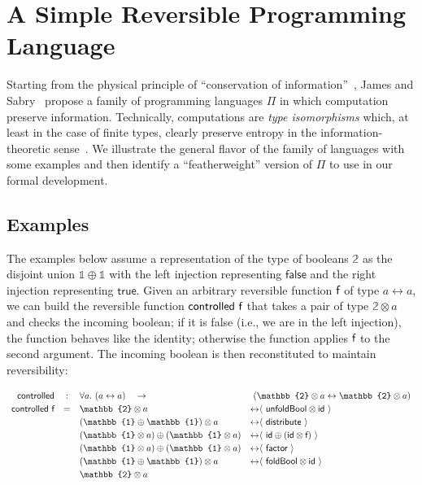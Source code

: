 \documentclass{entcs}
\newcommand{\byiso}[1]{{\leftrightarrow}{\langle} ~#1~ \rangle}
\newcommand{\ot}{\mathbb{1}}
\newcommand{\bt}{\mathbb{2}}
\begin{document}
\section{A Simple Reversible Programming Language}

Starting from the physical principle of ``conservation of
information''~\cite{Hey:1999:FCE:304763,fredkin1982conservative}, James and
Sabry~\cite{James:2012:IE:2103656.2103667} propose a family of programming
languages $\Pi$ in which computation preserve information. Technically,
computations are \emph{type isomorphisms} which, at least in the case of finite
types, clearly preserve entropy in the information-theoretic
sense~\cite{James:2012:IE:2103656.2103667}. We illustrate the general flavor of
the family of languages with some examples and then identify a ``featherweight''
version of $\Pi$ to use in our formal development.

\subsection{Examples}

The examples below assume a representation of the type of booleans $\bt$ as the
disjoint union $\ot \oplus \ot$ with the left injection representing
$\mathsf{false}$ and the right injection representing $\mathsf{true}$. Given an
arbitrary reversible function $\AgdaFunction{f}$ of type $a \leftrightarrow a$,
we can build the reversible function
$\AgdaFunction{controlled}~\AgdaFunction{f}$ that takes a pair of type
$\bt \otimes a$ and checks the incoming boolean; if it is false (i.e., we are in
the left injection), the function behaves like the identity; otherwise the
function applies $\AgdaFunction{f}$ to the second argument. The incoming boolean
is then reconstituted to maintain reversibility:

{\small
\[\def\arraystretch{1.2}\begin{array}{rcll}
\AgdaFunction{controlled}  &:& \forall a.~ (a \leftrightarrow a) \quad\rightarrow
                            & ~(\bt \otimes a \leftrightarrow \bt \otimes a) \\
\AgdaFunction{controlled}~\AgdaFunction{f} &=&

  \bt \otimes a
    & \byiso{\AgdaFunction{unfoldBool} \otimes \AgdaFunction{id}} \\
&& (\ot \oplus \ot) \otimes a
    & \byiso{\AgdaFunction{distribute}} \\
&& (\ot \otimes a) \oplus (\ot \otimes a)
    & \byiso{\AgdaFunction{id} \oplus (\AgdaFunction{id} \otimes \AgdaFunction{f})} \\
&& (\ot \otimes a) \oplus (\ot \otimes a)
    & \byiso{\AgdaFunction{factor}} \\
&& (\ot \oplus \ot) \otimes a
    & \byiso{\AgdaFunction{foldBool} \otimes \AgdaFunction{id}} \\
&& \bt \otimes a & ~ \\
\end{array}
\]}
\end{document}
